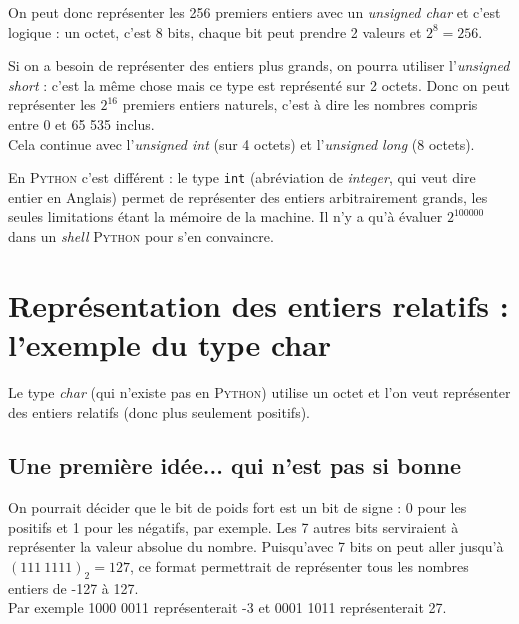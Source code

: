 \documentclass[a4paper,12pt,french]{book}
\begin{document}
On peut donc représenter les 256 premiers entiers avec un \textit{unsigned char} et c'est logique : un octet, c'est 8 bits, chaque bit peut prendre 2
valeurs et $2^8=256$.

Si on a besoin de représenter des entiers plus grands, on pourra utiliser l'\textit{unsigned short} : c'est la même chose mais ce type est représenté
sur 2 octets. Donc on peut représenter les $2^{16}$ premiers entiers naturels, c'est à dire les nombres compris entre 0 et 65 535 inclus.\\

Cela continue avec l'\textit{unsigned int} (sur 4 octets) et l'\textit{unsigned long} (8 octets).


\begin{remarque}[]
En  \textsc{Python} c'est différent : le type \texttt{int} (abréviation de \textit{integer}, qui veut dire \og entier \fg{} en Anglais) permet de
représenter des entiers arbitrairement grands, les seules limitations
étant la mémoire de la machine. Il n'y a qu'à évaluer $2^{100000}$  dans un \textit{shell} \textsc{Python} pour s'en convaincre.
\end{remarque}



\section{Représentation des entiers relatifs :\\l'exemple du type char}

Le type \textit{char} (qui n'existe pas en \textsc{Python}) utilise un octet et l'on veut représenter des
entiers relatifs (donc plus seulement positifs).

\subsection{Une première idée... qui n'est pas si bonne}

On pourrait décider que le bit de poids fort est un bit de signe : 0 pour les positifs et 1 pour les négatifs, par
exemple. Les 7 autres bits serviraient à représenter la valeur absolue du nombre. Puisqu'avec 7 bits on peut aller
jusqu'à $(111\ 1111)_2=127$, ce format permettrait de représenter tous les nombres entiers de -127 à 127.\\

Par exemple 1000 0011 représenterait -3 et 0001 1011 représenterait 27.\\
\end{document}
